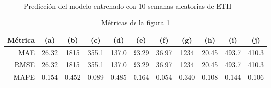 \documentclass[a4paper,10pt]{article}
\begin{document}
\begin{figure}[H]
    \\
  \caption{Predicción del modelo entrenado con 10 semanas aleatorias de ETH}
  \label{f:eth_wk_prophet}
\end{figure}

\begin{table}[H]
 \begin{center}
 \resizebox{12cm}{!} {
  \begin{tabular}{|r|c|c|c|c|c|c|c|c|c|c|}
    Métrica & (a) & (b) & (c) & (d) & (e) & (f) & (g) & (h) & (i) & (j) \\ \hline
    MAE & 26.32 & 1815 & 355.1 & 137.0 & 93.29 & 36.97& 1234& 20.45 & 493.7 & 410.3 \\
    RMSE & 26.32 & 1815 & 355.1 & 137.0 & 93.29 & 36.97& 1234& 20.45 & 493.7 & 410.3 \\
    MAPE & 0.154 & 0.452 & 0.089 & 0.485 & 0.164 & 0.054 & 0.340 & 0.108 & 0.144 & 0.106 \\ \hline
  \end{tabular}
  }
  \caption{Métricas de la figura \ref{f:eth_wk_prophet}}
  \label{tab:eth_prophet_wk}
 \end{center}
\end{table}
\end{document}
